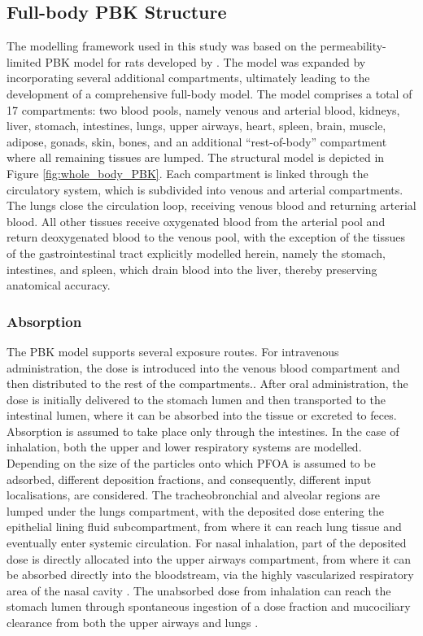 \documentclass[preprint,12pt,authoryear]{elsarticle}
\begin{document}
\subsection{Full-body PBK Structure }
The modelling framework used in this study was based on the  permeability-limited PBK model for rats developed by \citet{cheng_2017}. The model was expanded by incorporating several additional compartments, ultimately leading to the development of a comprehensive full-body model. The model comprises a total of 17 compartments: two blood pools, namely venous and arterial blood, kidneys, liver, stomach, intestines, lungs, upper airways, heart, spleen, brain, muscle, adipose, gonads, skin, bones, and an additional “rest-of-body”  compartment where all remaining tissues are lumped. The structural model is depicted in Figure \ref{fig:whole_body_PBK}. Each compartment is linked through the circulatory system, which is subdivided into venous and arterial compartments. The lungs close the circulation loop, receiving venous blood and returning arterial blood. All other tissues receive oxygenated blood from the arterial pool and return deoxygenated blood to the venous pool, with the exception of the tissues of the gastrointestinal tract explicitly modelled herein, namely the stomach, intestines, and spleen, which drain blood into the liver, thereby preserving anatomical accuracy. 

\subsubsection{Absorption}
The PBK model supports several exposure routes. For intravenous administration, the dose is introduced into the venous blood compartment and then distributed to the rest of the compartments.. After oral administration, the dose is initially delivered to the stomach lumen and then transported to the intestinal lumen,  where it can be absorbed into the tissue or excreted to feces. Absorption is assumed to take place only through the intestines. In the case of inhalation, both the upper and lower respiratory systems are modelled. Depending on the size of the particles onto which PFOA is assumed to be adsorbed, different deposition fractions, and consequently, different input localisations, are considered. The tracheobronchial and alveolar regions are lumped under the lungs compartment, with the deposited dose entering the epithelial lining fluid subcompartment, from where it can reach lung tissue and eventually enter systemic circulation. For nasal inhalation, part of the deposited dose is directly allocated into the upper airways compartment, from where it can be absorbed directly into the bloodstream, via the highly vascularized respiratory area of the nasal cavity \citep{grassinDelyle_2012}. The unabsorbed dose from inhalation can reach the stomach lumen through spontaneous ingestion of a dose fraction and mucociliary clearance from both the upper airways and lungs \citep{henriques_2022, chung_2022, rogers_2022}.
\end{document}
